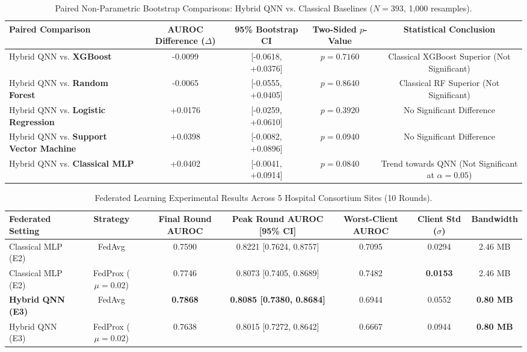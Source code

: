 \documentclass{article}
\begin{document}
\begin{table}[htbp]
\centering
\small
\caption{Paired Non-Parametric Bootstrap Comparisons: Hybrid QNN vs. Classical Baselines ($N = 393$, 1,000 resamples).}
\label{tab:paired_tests}
\begin{tabular}{lcccc}
\toprule
\textbf{Paired Comparison} & \textbf{AUROC Difference ($\Delta$)} & \textbf{95\% Bootstrap CI} & \textbf{Two-Sided $p$-Value} & \textbf{Statistical Conclusion} \\
\midrule
Hybrid QNN vs. \textbf{XGBoost} & -0.0099 & [-0.0618, +0.0376] & $p = 0.7160$ & Classical XGBoost Superior (Not Significant) \\
Hybrid QNN vs. \textbf{Random Forest} & -0.0065 & [-0.0555, +0.0405] & $p = 0.8640$ & Classical RF Superior (Not Significant) \\
Hybrid QNN vs. \textbf{Logistic Regression} & +0.0176 & [-0.0259, +0.0610] & $p = 0.3920$ & No Significant Difference \\
Hybrid QNN vs. \textbf{Support Vector Machine} & +0.0398 & [-0.0082, +0.0896] & $p = 0.0940$ & No Significant Difference \\
Hybrid QNN vs. \textbf{Classical MLP} & +0.0402 & [-0.0041, +0.0914] & $p = 0.0840$ & Trend towards QNN (Not Significant at $\alpha=0.05$) \\
\bottomrule
\end{tabular}
\end{table}

\vspace{1em}

\begin{table}[htbp]
\centering
\small
\caption{Federated Learning Experimental Results Across 5 Hospital Consortium Sites (10 Rounds).}
\label{tab:federated_results}
\begin{tabular}{lcccccc}
\toprule
\textbf{Federated Setting} & \textbf{Strategy} & \textbf{Final Round AUROC} & \textbf{Peak Round AUROC [95\% CI]} & \textbf{Worst-Client AUROC} & \textbf{Client Std ($\sigma$)} & \textbf{Bandwidth} \\
\midrule
Classical MLP (E2) & FedAvg & 0.7590 & 0.8221 [0.7624, 0.8757] & 0.7095 & 0.0294 & 2.46 MB \\
Classical MLP (E2) & FedProx ($\mu=0.02$) & 0.7746 & 0.8073 [0.7405, 0.8689] & 0.7482 & \textbf{0.0153} & 2.46 MB \\
\textbf{Hybrid QNN (E3)} & FedAvg & \textbf{0.7868} & \textbf{0.8085 [0.7380, 0.8684]} & 0.6944 & 0.0552 & \textbf{0.80 MB} \\
Hybrid QNN (E3) & FedProx ($\mu=0.02$) & 0.7638 & 0.8015 [0.7272, 0.8642] & 0.6667 & 0.0944 & \textbf{0.80 MB} \\
\bottomrule
\end{tabular}
\end{table}
\end{document}
